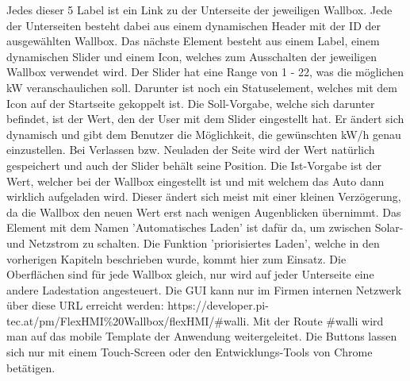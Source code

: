Jedes dieser 5 Label ist ein Link zu der Unterseite der jeweiligen Wallbox. Jede der Unterseiten besteht dabei aus einem dynamischen Header mit der ID der ausgewählten Wallbox. Das nächste Element besteht aus einem Label, einem dynamischen Slider und einem Icon, welches zum Ausschalten der jeweiligen Wallbox verwendet wird. Der Slider hat eine Range von 1 - 22, was die möglichen kW veranschaulichen soll. Darunter ist noch ein Statuselement, welches mit dem Icon auf der Startseite gekoppelt ist. Die Soll-Vorgabe, welche sich darunter befindet, ist der Wert, den der User mit dem Slider eingestellt hat. Er ändert sich dynamisch und gibt dem Benutzer die Möglichkeit, die gewünschten kW/h genau einzustellen. Bei Verlassen bzw. Neuladen der Seite wird der Wert natürlich gespeichert und auch der Slider behält seine Position. Die Ist-Vorgabe ist der Wert, welcher bei der Wallbox eingestellt ist und mit welchem das Auto dann wirklich aufgeladen wird. Dieser ändert sich meist mit einer kleinen Verzögerung, da die Wallbox den neuen Wert erst nach wenigen Augenblicken übernimmt. Das Element mit dem Namen 'Automatisches Laden' ist dafür da, um zwischen Solar- und Netzstrom zu schalten. Die Funktion 'priorisiertes Laden', welche in den vorherigen Kapiteln beschrieben wurde, kommt hier zum Einsatz. Die Oberflächen sind für jede Wallbox gleich, nur wird auf jeder Unterseite eine andere Ladestation angesteuert. Die GUI kann nur im Firmen internen Netzwerk über diese URL erreicht werden: https://developer.pi-tec.at/pm/FlexHMI\%20Wallbox/flexHMI/\#walli. Mit der Route \#walli wird man auf das mobile Template der Anwendung weitergeleitet. Die Buttons lassen sich nur mit einem Touch-Screen oder den Entwicklungs-Tools von Chrome betätigen.



